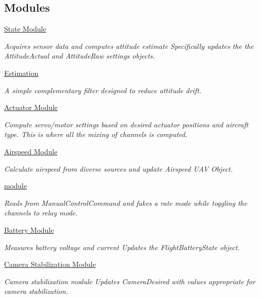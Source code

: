 \subsection*{Modules}
\begin{DoxyCompactItemize}
\item 
\hyperlink{group___state}{State Module}
\begin{DoxyCompactList}\small\item\em Acquires sensor data and computes attitude estimate Specifically updates the the Attitude\-Actual and Attitude\-Raw settings objects. \end{DoxyCompactList}\item 
\hyperlink{group___attitude}{Estimation}
\begin{DoxyCompactList}\small\item\em A simple complementary filter designed to reduce attitude drift. \end{DoxyCompactList}\item 
\hyperlink{group___actuator_module}{Actuator Module}
\begin{DoxyCompactList}\small\item\em Compute servo/motor settings based on desired actuator positions and aircraft type. This is where all the mixing of channels is computed. \end{DoxyCompactList}\item 
\hyperlink{group___airspeed_module}{Airspeed Module}
\begin{DoxyCompactList}\small\item\em Calculate airspeed from diverse sources and update Airspeed U\-A\-V Object. \end{DoxyCompactList}\item 
\hyperlink{group___autotuning}{module}
\begin{DoxyCompactList}\small\item\em Reads from Manual\-Control\-Command and fakes a rate mode while toggling the channels to relay mode. \end{DoxyCompactList}\item 
\hyperlink{group___battery_module}{Battery Module}
\begin{DoxyCompactList}\small\item\em Measures battery voltage and current Updates the Flight\-Battery\-State object. \end{DoxyCompactList}\item 
\hyperlink{group___camera_stab}{Camera Stabilization Module}
\begin{DoxyCompactList}\small\item\em Camera stabilization module Updates Camera\-Desired with values appropriate for camera stabilization. \end{DoxyCompactList}\item 

\end{DoxyCompactItemize}

